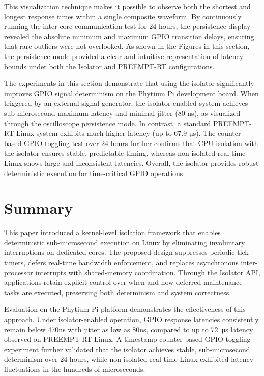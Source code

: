 \documentclass[letterpaper]{article}
\begin{document}
This visualization technique makes it possible to observe both the shortest and longest response
times within a single composite waveform. By continuously running the inter-core communication
test for 24 hours, the persistence display revealed the absolute minimum and maximum GPIO
transition delays, ensuring that rare outliers were not overlooked. As shown in
the Figures in this section, the persistence mode provided
a clear and intuitive representation of latency bounds under both the Isolator and PREEMPT-RT
configurations.


The experiments in this section demonstrate that using the isolator significantly improves GPIO signal determinism on the Phytium Pi development board. When triggered by an external signal generator, the isolator-enabled system achieves sub-microsecond maximum latency and minimal jitter (80 ns), as visualized through the oscilloscope persistence mode. In contrast, a standard PREEMPT-RT Linux system exhibits much higher latency (up to 67.9 µs). The counter-based GPIO toggling test over 24 hours further confirms that CPU isolation with the isolator ensures stable, predictable timing, whereas non-isolated real-time Linux shows large and inconsistent latencies. Overall, the isolator provides robust deterministic execution for time-critical GPIO operations.

\section{Summary}
This paper introduced a kernel-level isolation framework that enables deterministic sub-microsecond execution on Linux by eliminating involuntary interruptions on dedicated cores. The proposed design suppresses periodic tick timers, defers real-time bandwidth enforcement, and replaces asynchronous inter-processor interrupts with shared-memory coordination. Through the Isolator API, applications retain explicit control over when and how deferred maintenance tasks are executed, preserving both determinism and system correctness.

Evaluation on the Phytium Pi platform demonstrates the effectiveness of this approach. Under isolator-enabled operation, GPIO response latencies consistently remain below 470ns with jitter as low as 80ns, compared to up to 72~µs latency observed on PREEMPT-RT Linux. A timestamp-counter based GPIO toggling experiment further validated that the isolator achieves stable, sub-microsecond determinism over 24 hours, while non-isolated real-time Linux exhibited latency fluctuations in the hundreds of microseconds.
\end{document}
